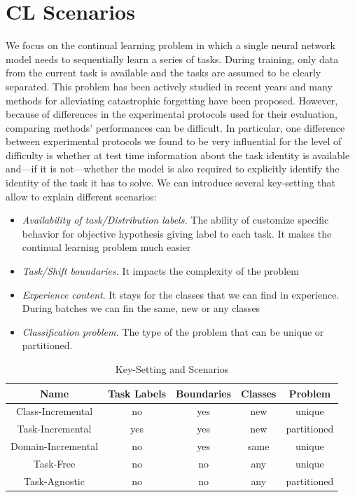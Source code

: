 \documentclass[english, LaM, oneside]{sapthesis}%
\begin{document}
\section{CL Scenarios}
We focus on the continual learning problem in which a single neural network model needs to sequentially learn a series of tasks. During training, only data from the current task is available and the tasks are assumed to be clearly separated. This problem has been actively studied in recent years and many methods for alleviating catastrophic forgetting have been proposed. However, because of differences in the experimental protocols used for their evaluation, comparing methods’ performances can be difficult. In particular, one difference between experimental protocols we found to be very influential for the level of difficulty is whether at test time information about the task identity is available and—if it is not—whether the model is also required to explicitly identify the identity of the task it has to solve.
We can introduce several key-setting that allow to explain different scenarios:
\begin{itemize}
\item \textit{Availability of task/Distribution labels.} The ability of customize specific behavior for objective hypothesis giving label to each task. It makes the continual learning problem much easier
\item \textit{Task/Shift boundaries.} It impacts the complexity of the problem
\item \textit{Experience content}. It stays for the classes that we can find in experience. During batches we can fin the same, new or any classes
\item \textit{Classification problem.} The type of the problem that can be unique or partitioned.
\end{itemize}



\begin{table}[h]
            \centering
            \begin{tabular}{ |c|c|c|c|c|  }
                \hline
                \textbf{Name} & \textbf{Task Labels} & \textbf{Boundaries} & \textbf{Classes} & \textbf{Problem}\\
                \hline \hline
                Class-Incremental & no & yes &  new & unique\\
                \hline
                Task-Incremental & yes & yes &  new & partitioned\\
                \hline
                Domain-Incremental & no & yes &  same & unique\\
                \hline
                Task-Free & no & no &  any & unique\\
                \hline
                Task-Agnostic & no & no &  any & partitioned\\
                
                
                \hline 
                
            \end{tabular}
            
            \caption{Key-Setting and Scenarios}
            \label{tab:vggrob}
        \end{table}
\end{document}
